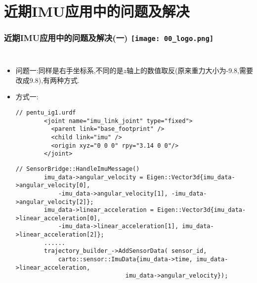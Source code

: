 \section{近期IMU应用中的问题及解决}


\begin{frame}[fragile]
  \frametitle{近期IMU应用中的问题及解决(一) \hfill \texttt{[image: 00\_logo.png]}}
  \begin{columns}
    
    \begin{itemize}
      \item 问题一:同样是右手坐标系,不同的是$z$轴上的数值取反(原来重力大小为-9.8,需要改成9.8),有两种方式.

      \item 方式一:
      
      \begin{lstlisting}[frame=shadowbox]  
        // pentu_ig1.urdf
        <joint name="imu_link_joint" type="fixed">
          <parent link="base_footprint" />
          <child link="imu" />
          <origin xyz="0 0 0" rpy="3.14 0 0"/>
        </joint>
      \end{lstlisting}

      \begin{lstlisting}[frame=shadowbox]  
        // SensorBridge::HandleImuMessage()
        imu_data->angular_velocity = Eigen::Vector3d{imu_data->angular_velocity[0], 
            -imu_data->angular_velocity[1], -imu_data->angular_velocity[2]};
        imu_data->linear_acceleration = Eigen::Vector3d{imu_data->linear_acceleration[0],
            -imu_data->linear_acceleration[1], imu_data->linear_acceleration[2]};    
        ......    
        trajectory_builder_->AddSensorData( sensor_id,
            carto::sensor::ImuData{imu_data->time, imu_data->linear_acceleration,
                               imu_data->angular_velocity});
      \end{lstlisting}

    \end{itemize}
    

  
  \end{columns}
  \end{frame}   

